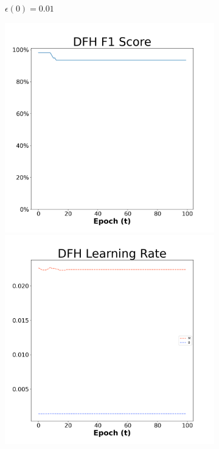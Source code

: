 \begin{figure}[H]
\begin{subfigure}{0.3\textwidth}
  \caption{$\epsilon(0)=0.01$}
\end{subfigure}\hfil %
\begin{subfigure}{0.3\textwidth}
  \includegraphics[width=\linewidth]{images/exper2/breast/DFH_0.03_f1.png}
  \includegraphics[width=\linewidth]{images/exper2/breast/DFH_0.03_lr.png}

\end{subfigure}
\end{figure}

